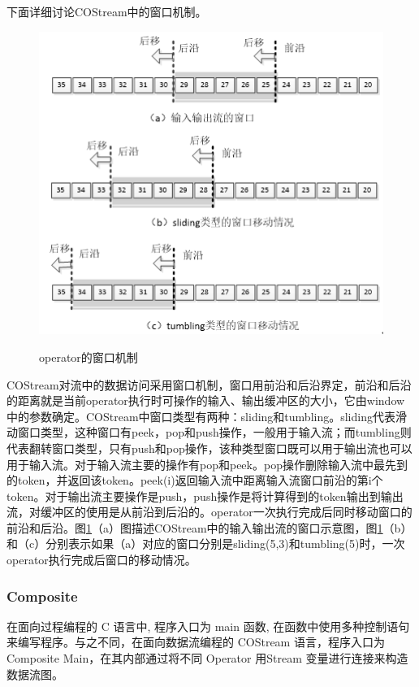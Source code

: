 下面详细讨论COStream中的窗口机制。
\begin{figure}[htbp]
	\centering
	\includegraphics[width=5in]{Img/Chap_Application/Yu/operator.png}\\
	\caption{operator的窗口机制}\label{fig:operator}
\end{figure}
COStream对流中的数据访问采用窗口机制，窗口用前沿和后沿界定，前沿和后沿的距离就是当前operator执行时可操作的输入、输出缓冲区的大小，它由window中的参数确定。COStream中窗口类型有两种：sliding和tumbling。sliding代表滑动窗口类型，这种窗口有peek，pop和push操作，一般用于输入流；而tumbling则代表翻转窗口类型，只有push和pop操作，该种类型窗口既可以用于输出流也可以用于输入流。对于输入流主要的操作有pop和peek。pop操作删除输入流中最先到的token，并返回该token。peek(i)返回输入流中距离输入流窗口前沿的第i个token。对于输出流主要操作是push，push操作是将计算得到的token输出到输出流，对缓冲区的使用是从前沿到后沿的。operator一次执行完成后同时移动窗口的前沿和后沿。图\ref{fig:operator}（a）图描述COStream中的输入输出流的窗口示意图，图\ref{fig:operator}（b）和（c）分别表示如果（a）对应的窗口分别是sliding(5,3)和tumbling(5)时，一次operator执行完成后窗口的移动情况。


\subsubsection{Composite}
在面向过程编程的 C 语言中, 程序入口为 main 函数, 在函数中使用多种控制语句来编写程序。与之不同，在面向数据流编程的 COStream 语言，程序入口为 Composite Main，在其内部通过将不同 Operator 用Stream 变量进行连接来构造数据流图。

